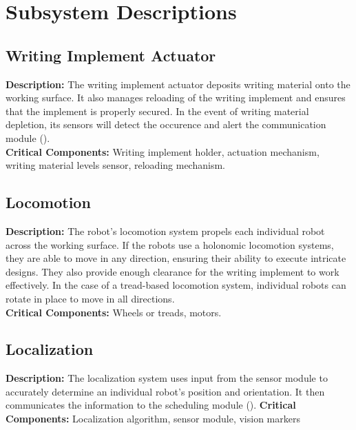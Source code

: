 
\section{Subsystem Descriptions}
\label{sec:subsystem_descriptions}




\subsection{Writing Implement Actuator}
\label{sec:subsystem_writing_implement_actuator}
\textbf{Description:} The writing implement actuator deposits writing material onto the working surface. It also manages reloading of the writing implement and ensures that the implement is properly secured. In the event of writing material depletion, its sensors will detect the occurence and alert the communication module ().\\
\textbf{Critical Components:} Writing implement holder, actuation mechanism, writing material levels sensor, reloading mechanism.\\

\subsection{Locomotion}
\label{sec:subsystem_locomotion}
\textbf{Description:} The robot's locomotion system propels each individual robot across the working surface. If the robots use a holonomic locomotion systems, they are able to move in any direction, ensuring their ability to execute intricate designs. They also provide enough clearance for the writing implement to work effectively. In the case of a tread-based locomotion system, individual robots can rotate in place to move in all directions.\\
\textbf{Critical Components:} Wheels or treads, motors.\\


\subsection{Localization}
\label{sec:subsystem_localization}
\textbf{Description:} The localization system uses input from the sensor module to accurately determine an individual robot's position and orientation. It then communicates the information to the scheduling module (). 
\textbf{Critical Components:} Localization algorithm, sensor module, vision markers

